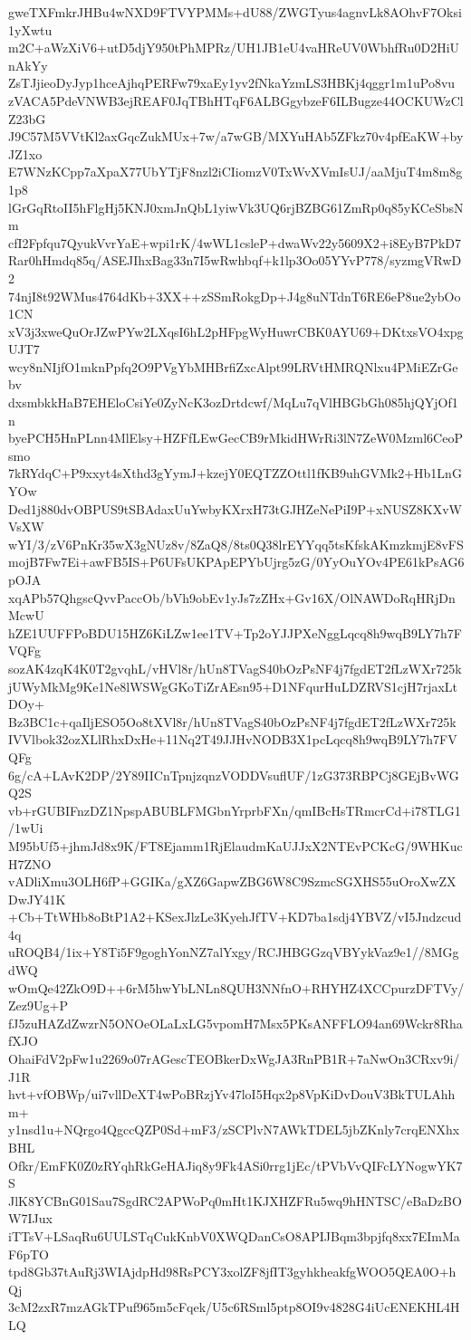 gweTXFmkrJHBu4wNXD9FTVYPMMs+dU88/ZWGTyus4agnvLk8AOhvF7Oksi1yXwtu
m2C+aWzXiV6+utD5djY950tPhMPRz/UH1JB1eU4vaHReUV0WbhfRu0D2HiUnAkYy
ZsTJjieoDyJyp1hceAjhqPERFw79xaEy1yv2fNkaYzmLS3HBKj4qggr1m1uPo8vu
zVACA5PdeVNWB3ejREAF0JqTBhHTqF6ALBGgybzeF6ILBugze44OCKUWzClZ23bG
J9C57M5VVtKl2axGqcZukMUx+7w/a7wGB/MXYuHAb5ZFkz70v4pfEaKW+byJZ1xo
E7WNzKCpp7aXpaX77UbYTjF8nzl2iCIiomzV0TxWvXVmIsUJ/aaMjuT4m8m8g1p8
lGrGqRtoII5hFlgHj5KNJ0xmJnQbL1yiwVk3UQ6rjBZBG61ZmRp0q85yKCeSbsNm
cfI2Fpfqu7QyukVvrYaE+wpi1rK/4wWL1csleP+dwaWv22y5609X2+i8EyB7PkD7
Rar0hHmdq85q/ASEJIhxBag33n7I5wRwhbqf+k1lp3Oo05YYvP778/syzmgVRwD2
74njI8t92WMus4764dKb+3XX++zSSmRokgDp+J4g8uNTdnT6RE6eP8ue2ybOo1CN
xV3j3xweQuOrJZwPYw2LXqsI6hL2pHFpgWyHuwrCBK0AYU69+DKtxsVO4xpgUJT7
wcy8nNIjfO1mknPpfq2O9PVgYbMHBrfiZxcAlpt99LRVtHMRQNlxu4PMiEZrGebv
dxsmbkkHaB7EHEloCsiYe0ZyNcK3ozDrtdcwf/MqLu7qVlHBGbGh085hjQYjOf1n
byePCH5HnPLnn4MlElsy+HZFfLEwGecCB9rMkidHWrRi3lN7ZeW0Mzml6CeoPsmo
7kRYdqC+P9xxyt4sXthd3gYymJ+kzejY0EQTZZOttl1fKB9uhGVMk2+Hb1LnGYOw
Ded1j880dvOBPUS9tSBAdaxUuYwbyKXrxH73tGJHZeNePiI9P+xNUSZ8KXvWVsXW
wYI/3/zV6PnKr35wX3gNUz8v/8ZaQ8/8ts0Q38lrEYYqq5tsKfskAKmzkmjE8vFS
mojB7Fw7Ei+awFB5IS+P6UFsUKPApEPYbUjrg5zG/0YyOuYOv4PE61kPsAG6pOJA
xqAPb57QhgscQvvPaccOb/bVh9obEv1yJs7zZHx+Gv16X/OlNAWDoRqHRjDnMcwU
hZE1UUFFPoBDU15HZ6KiLZw1ee1TV+Tp2oYJJPXeNggLqcq8h9wqB9LY7h7FVQFg
sozAK4zqK4K0T2gvqhL/vHVl8r/hUn8TVagS40bOzPsNF4j7fgdET2fLzWXr725k
jUWyMkMg9Ke1Ne8lWSWgGKoTiZrAEsn95+D1NFqurHuLDZRVS1cjH7rjaxLtDOy+
Bz3BC1c+qaIljESO5Oo8tXVl8r/hUn8TVagS40bOzPsNF4j7fgdET2fLzWXr725k
IVVlbok32ozXLlRhxDxHe+11Nq2T49JJHvNODB3X1pcLqcq8h9wqB9LY7h7FVQFg
6g/cA+LAvK2DP/2Y89IICnTpnjzqnzVODDVsuflUF/1zG373RBPCj8GEjBvWGQ2S
vb+rGUBIFnzDZ1NpspABUBLFMGbnYrprbFXn/qmIBcHsTRmcrCd+i78TLG1/1wUi
M95bUf5+jhmJd8x9K/FT8Ejamm1RjElaudmKaUJJxX2NTEvPCKcG/9WHKucH7ZNO
vADliXmu3OLH6fP+GGIKa/gXZ6GapwZBG6W8C9SzmcSGXHS55uOroXwZXDwJY41K
+Cb+TtWHb8oBtP1A2+KSexJlzLe3KyehJfTV+KD7ba1sdj4YBVZ/vI5Jndzcud4q
uROQB4/1ix+Y8Ti5F9goghYonNZ7alYxgy/RCJHBGGzqVBYykVaz9e1//8MGgdWQ
wOmQe42ZkO9D++6rM5hwYbLNLn8QUH3NNfnO+RHYHZ4XCCpurzDFTVy/Zez9Ug+P
fJ5zuHAZdZwzrN5ONOeOLaLxLG5vpomH7Msx5PKsANFFLO94an69Wckr8RhafXJO
OhaiFdV2pFw1u2269o07rAGescTEOBkerDxWgJA3RnPB1R+7aNwOn3CRxv9i/J1R
hvt+vfOBWp/ui7vllDeXT4wPoBRzjYv47loI5Hqx2p8VpKiDvDouV3BkTULAhhm+
y1nsd1u+NQrgo4QgccQZP0Sd+mF3/zSCPlvN7AWkTDEL5jbZKnly7crqENXhxBHL
Ofkr/EmFK0Z0zRYqhRkGeHAJiq8y9Fk4ASi0rrg1jEc/tPVbVvQIFcLYNogwYK7S
JlK8YCBnG01Sau7SgdRC2APWoPq0mHt1KJXHZFRu5wq9hHNTSC/eBaDzBOW7IJux
iTTsV+LSaqRu6UULSTqCukKnbV0XWQDanCsO8APIJBqm3bpjfq8xx7EImMaF6pTO
tpd8Gb37tAuRj3WIAjdpHd98RsPCY3xolZF8jfIT3gyhkheakfgWOO5QEA0O+hQj
3cM2zxR7mzAGkTPuf965m5cFqek/U5c6RSml5ptp8OI9v4828G4iUcENEKHL4HLQ
